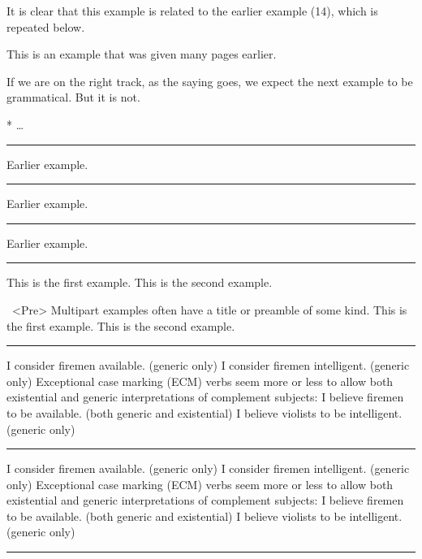 \documentclass[12pt]{article}
\begin{document}
\noindent It is clear that this example is related to the earlier
example (14), which is repeated below.

\ex[exno=14]
This is an example that was given many pages earlier.\xe

\noindent If we are on the right track, as the saying goes,
we expect the next example to be grammatical.  But it is not.

\ex[exno=96] * \dots\xe
\endgroup
\bigskip

\filbreak\hrule\medskip

\begingroup
\ex[exno=$\Delta$] Earlier example.\xe
\endgroup
\bigskip

\filbreak\hrule\medskip

\begingroup
\ex[exno={14, repeated}] Earlier example.\xe
\endgroup
\bigskip

\filbreak\hrule\medskip

\begingroup
\ex[exno={14, repeated},exnoformat={[X]}] Earlier example.\xe
\endgroup
\bigskip

\filbreak\hrule\medskip

\begingroup
\pex
\a This is the first example.
\a This is the second example.
\xe

\pex~<Pre> Multipart examples often have a title or preamble of some
kind.
\a This is the first example.
\a This is the second example.
\xe
\endgroup
\bigskip

\filbreak\hrule\medskip

\begingroup
\keepexcntlocal {}
\pex
\a I consider firemen available. (generic only)
\a I consider firemen intelligent. (generic only)
\xe
Exceptional case marking (ECM) verbs seem more or less to allow both
existential and generic interpretations of complement subjects:
\pex
\a I believe firemen to be available. (both generic and existential)
\a I believe violists to be intelligent. (generic only)
\xe
\endgroup
\bigskip

\filbreak\hrule\medskip

\begingroup
\keepexcntlocal {}
\pex[sampleexno=(\anextx)]
\a I consider firemen available. (generic only)
\a I consider firemen intelligent. (generic only)
\xe
Exceptional case marking (ECM) verbs seem more or less to allow both
existential and generic interpretations of complement subjects:
\pex
\a I believe firemen to be available. (both generic and existential)
\a I believe violists to be intelligent. (generic only)
\xe
\endgroup
\bigskip

\filbreak\hrule\medskip
\end{document}
